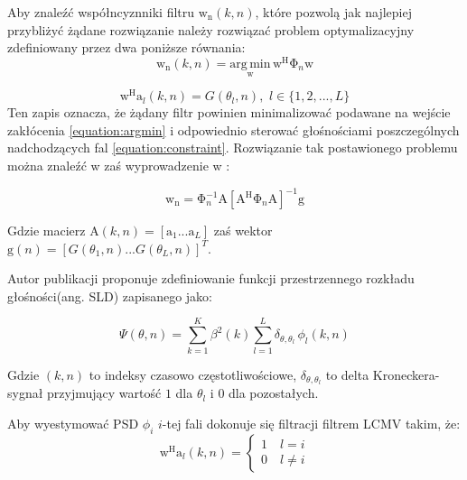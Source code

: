 \noindent Aby znaleźć współncyznniki filtru $\bm{\mathrm{w}}_{\mathrm{n}}(k,n)$, które pozwolą jak najlepiej przybliżyć żądane rozwiązanie należy rozwiązać problem optymalizacyjny zdefiniowany przez dwa poniższe równania:
\begin{equation}
    \label{equation:argmin}
    \bm{\mathrm{w}}_{\mathrm{n}}(k,n) = 
    \underset{\bm{\mathrm{w}}}{\mathrm{arg \, min}} \,
    \bm{\mathrm{w}}^{\mathrm{H}}
    \bm{\mathrm{\Phi}}_{n}
    \bm{\mathrm{w}}
\end{equation}

\begin{equation}
    \label{equation:constraint}
    \bm{\mathrm{w}}^{\mathrm{H}}
    \bm{\mathrm{a}}_{l}(k,n)=
    G(\theta_{l},n),
    \, \, l \in \{1,2,...,L\}
\end{equation}
Ten zapis oznacza, że żądany filtr powinien minimalizować podawane na wejście zakłócenia \eqref{equation:argmin} i odpowiednio sterować głośnościami poszczególnych nadchodzących fal \eqref{equation:constraint}. Rozwiązanie tak postawionego problemu można znaleźć w \cite{Thiergart2013} zaś wyprowadzenie w \cite{Frost1972}:

\begin{equation}
    \label{equation:lcmv formula}
    \bm{\mathrm{w}}_{\mathrm{n}}=
    \bm{\mathrm{\Phi}}_{n}^{-1}\bm{\mathrm{A}}
    [\bm{\mathrm{A}}^{\mathrm{H}} \bm{\mathrm{\Phi}}_{n} \bm{\mathrm{A}}]^{-1}
    \bm{\mathrm{g}}
\end{equation}

\noindent Gdzie macierz $\bm{\mathrm{A}}(k,n)=
[\bm{\mathrm{a}}_{1}...\bm{\mathrm{a}}_{L}]$ zaś wektor $\bm{\mathrm{g}}(n)=[G(\theta_{1},n)...G(\theta_{L},n)]^{T}$.

\newpage
\noindent Autor publikacji \cite{Braun2014} proponuje zdefiniowanie funkcji przestrzennego rozkładu głośności(ang. SLD) zapisanego jako:

\begin{equation}
    \label{equation:SLD}
    \Psi(\theta,n)=
    \sum_{k=1}^{K} \beta^{2}(k)
    \sum_{l=1}^{L}\delta_{\theta,\theta_{l}}
    \, \phi_{l}(k,n)
\end{equation}

\noindent Gdzie $(k,n)$ to indeksy czasowo częstotliwościowe, $\delta_{\theta,\theta_{l}}$ to delta Kroneckera- sygnał przyjmujący wartość $1$ dla $\theta_{l}$ i $0$ dla pozostałych.

\noindent Aby wyestymować PSD $\phi_{i}$ $i$-tej fali dokonuje się filtracji filtrem LCMV takim, że:
\begin{equation}
    \label{equation:power estimation}
    \bm{\mathrm{w}}^{\mathrm{H}}\bm{\mathrm{a}}_{l}(k,n)=
    \begin{cases}
        1 \quad l=i \\
        0 \quad l \neq i
    \end{cases}
\end{equation}


